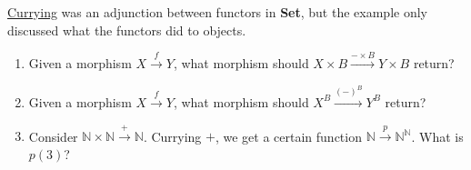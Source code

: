 \href{doc/1 math/Seven Sketches in Compositionality/Chapter 3: Databases/4 Adjunctions and data migration/2 Adjunctions/3 Currying}{Currying} was an adjunction between functors in \textbf{Set}, but the example only discussed what the functors did to objects.
    \begin{enumerate}
      \item Given a morphism $X \xrightarrow{f}Y$, what morphism should $X \times B \xrightarrow{-\times B}Y\times B$ return?
      \item Given a morphism $X \xrightarrow{f}Y$, what morphism should $X^ B \xrightarrow{(-)^B}Y^B$ return?
      \item Consider $\mathbb{N}\times \mathbb{N}\xrightarrow{+}\mathbb{N}$. Currying $+$, we get a certain function $\mathbb{N}\xrightarrow{p}\mathbb{N}^\mathbb{N}$. What is $p(3)$?
    \end{enumerate}